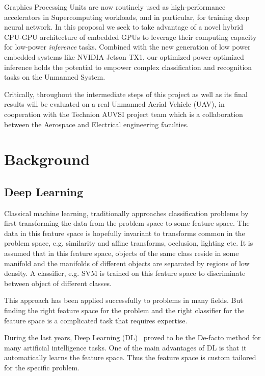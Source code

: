 \documentclass{article} %
\begin{document}
Graphics Processing Units are now routinely used as high-performance
accelerators in Supercomputing workloads, and in particular, for training deep neural
network.  In this proposal we seek to take advantage of a novel hybrid CPU-GPU architecture 
of embedded GPUs to leverage their computing capacity for low-power
\emph{inference} tasks. Combined with the new generation of low power embedded
systems like NVIDIA Jetson TX1,  our optimized power-optimized inference holds
the potential to empower complex classification and recognition tasks on the
Unmanned System. 

Critically, throughout the intermediate steps of this project as well as its
final results will be evaluated on a real Unmanned Aerial Vehicle (UAV), in cooperation with the Technion AUVSI project
team which is a collaboration between the Aerospace and Electrical engineering
faculties. 




\section{Background}

\subsection{Deep Learning}
\label{sec:deep_learning}

Classical machine learning, traditionally approaches classification problems
by first transforming the data from the problem space to some feature
space. The data in this feature space is hopefully invariant to transforms common
in the problem space, e.g. similarity and affine transforms, occlusion, lighting
etc. It is assumed that in this feature space, objects of the same class reside
in some manifold and the manifolds of different objects are separated by regions
of low density. A classifier, e.g. SVM is trained on this feature space to
discriminate between object of different classes.

This approach has been applied successfully to problems in many fields. But
finding the right
feature space for the problem and the right classifier for the feature space is
a complicated task that requires expertise.

During the last years, Deep Learning (DL)~\cite{Bengio2009, LeCun2015} proved to be the De-facto method for
many artificial intelligence tasks. One of the main advantages of DL is that
it automatically learns the feature space. Thus the feature space is custom
tailored for the specific problem.
\end{document}
